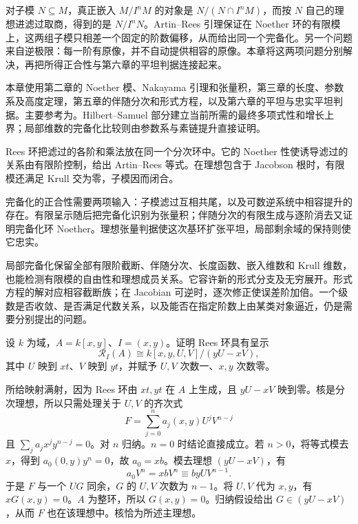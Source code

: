 \ProseParagraphBreak

对子模 \(N\subseteq M\)，真正嵌入 \(M/I^nM\) 的对象是
\(N/(N\cap I^nM)\)，而按 \(N\) 自己的理想进滤过取商，得到的是 \(N/I^nN\)。Artin–Rees 引理保证在 Noether 环的有限模上，这两组子模只相差一个固定的阶数偏移，从而给出同一个完备化。另一个问题来自逆极限：每一阶有原像，并不自动提供相容的原像。本章将这两项问题分别解决，再把所得正合性与第六章的平坦判据连接起来。

\ProseParagraphBreak

本章使用第二章的 Noether 模、Nakayama 引理和张量积，第三章的长度、参数系及高度定理，第五章的伴随分次和形式方程，以及第六章的平坦与忠实平坦判据。主要参考为\cite[第8节，第55—63页；第13节，第93—98页]{Matsumura1989}。Hilbert–Samuel 部分建立当前所需的最终多项式性和增长上界；局部维数的完备化比较则由参数系与素链提升直接证明。







\begin{chaptersummary}
	Rees 环把滤过的各阶和乘法放在同一个分次环中。它的 Noether 性使诱导滤过的关系由有限阶控制，给出 Artin–Rees 等式。在理想包含于 Jacobson 根时，有限模还满足 Krull 交为零，子模因而闭合。

	\ProseParagraphBreak

	完备化的正合性需要两项输入：子模滤过互相共尾，以及可数逆系统中相容提升的存在。有限呈示随后把完备化识别为张量积；伴随分次的有限生成与逐阶消去又证明完备化环 Noether。理想张量判据使这次基环扩张平坦，局部剩余域的保持则使它忠实。

	\ProseParagraphBreak

	局部完备化保留全部有限阶截断、伴随分次、长度函数、嵌入维数和 Krull 维数，也能检测有限模的自由性和理想成员关系。它容许新的形式分支及无穷展开。形式方程的解对应相容截断族；在 Jacobian 可逆时，逐次修正使误差阶加倍。一个级数是否收敛、是否满足代数关系，以及能否在指定阶数上由某类对象逼近，仍是需要分别提出的问题。
\end{chaptersummary}

\BookExercises

\begin{exercise}\label{g5:ex:rees-two-generators}
	设 \(k\) 为域，\(A=k[x,y]\)、\(I=(x,y)\)。证明 Rees 环具有呈示
	\[
		\mathcal R_I(A)\cong
		k[x,y,U,V]/(yU-xV),
	\]
	其中 \(U\) 映到 \(xt\)、\(V\) 映到 \(yt\)，并赋予 \(U,V\) 次数一、\(x,y\) 次数零。
\end{exercise}
\begin{solution}
	所给映射满射，因为 Rees 环由 \(xt,yt\) 在 \(A\) 上生成，且 \(yU-xV\) 映到零。核是分次理想，所以只需处理关于 \(U,V\) 的齐次式
	\[
		F=\sum_{j=0}^n a_j(x,y)U^jV^{n-j}
	\]
	且 \(\sum_j a_jx^jy^{n-j}=0\)。对 \(n\) 归纳。\(n=0\) 时结论直接成立。若 \(n>0\)，将等式模去 \(x\)，得到
	\(a_0(0,y)y^n=0\)，故 \(a_0=xb\)。模去理想 \((yU-xV)\)，有
	\[
		a_0V^n=xbV^n\equiv byUV^{n-1}.
	\]
	于是 \(F\) 与一个 \(UG\) 同余，\(G\) 的 \(U,V\) 次数为 \(n-1\)。将 \(U,V\) 代为 \(x,y\)，有 \(xG(x,y)=0\)。\(A\) 为整环，所以 \(G(x,y)=0\)。归纳假设给出 \(G\in(yU-xV)\)，从而 \(F\) 也在该理想中。核恰为所述主理想。
\end{solution}

